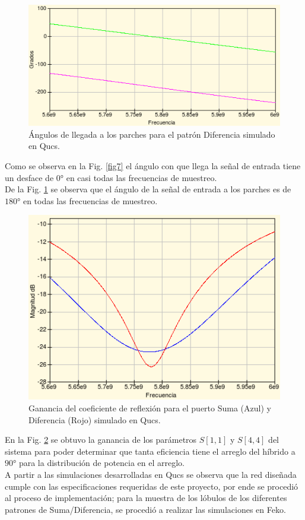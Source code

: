 \documentclass[twocolumn]{IEEEtran}
\begin{document}
\begin{figure}[]
	\centering
		\includegraphics[scale=0.6]{resta.png}
	\caption{Ángulos de llegada a los parches para el patrón Diferencia simulado en Qucs.}
	\label{fig8}
\end{figure}
\noindent
Como se observa en la Fig. \ref{fig7} el ángulo con que llega la señal de entrada tiene un desface de $0°$ en casi todas las frecuencias de muestreo.\\ De la Fig. \ref{fig8} se observa que el ángulo de la señal de entrada a los parches es de $180°$ en todas las frecuencias de muestreo.
\begin{figure}[H]
	\centering
		\includegraphics[scale=0.6]{paras.png}
	\caption{Ganancia del coeficiente de reflexión para el puerto Suma (Azul) y Diferencia (Rojo) simulado en Qucs.}
	\label{fig9}
\end{figure}
\noindent
En la Fig. \ref{fig9} se obtuvo la ganancia de los parámetros $S[1,1]$ y $S[4,4]$ del sistema para poder determinar que tanta eficiencia tiene el arreglo del híbrido a $90°$ para la distribución de potencia en el arreglo.\\
A partir a las simulaciones desarrolladas en Qucs se observa que la red diseñada cumple con las especificaciones requeridas de este proyecto, por ende se procedió al proceso de implementación; para la muestra de los lóbulos de los diferentes patrones de Suma/Diferencia, se procedió a realizar las simulaciones en Feko.
\end{document}
